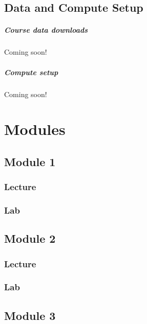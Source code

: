 \documentclass[
]{book}
\begin{document}
\chapter{Data and Compute Setup}\label{data-and-compute-setup}

\subsubsection{Course data downloads}\label{course-data-downloads}

Coming soon!

\subsubsection{Compute setup}\label{compute-setup}

Coming soon!

\part{Modules}\label{part-modules}

\chapter{Module 1}\label{module-1}

\section{Lecture}\label{lecture}

\section{Lab}\label{lab}

\chapter{Module 2}\label{module-2}

\section{Lecture}\label{lecture-1}

\section{Lab}\label{lab-1}

\chapter{Module 3}\label{module-3}
\end{document}
